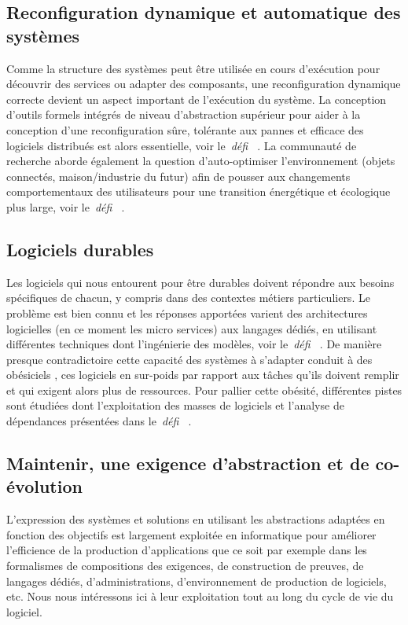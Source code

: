 \documentclass[11pt]{article}
\newcommand{\defi}[1]{\emph{défi~%
\cite{#1}}}
\begin{document}
\subsection{Reconfiguration dynamique et automatique des systèmes \label{ss:maintenance:reconfiguration}}
Comme la structure des systèmes peut être utilisée en cours d'exécution pour découvrir des services ou adapter des composants, une reconfiguration dynamique correcte devient un aspect important de l'exécution du système. La conception d'outils formels intégrés de niveau d'abstraction supérieur pour aider à la conception d'une reconfiguration sûre, tolérante aux pannes et efficace des logiciels distribués est alors essentielle, voir le~\defi{reconfiguration}. 
La communauté de recherche aborde  également la question d’auto-optimiser 
l'environnement (objets connectés, maison/industrie du futur)
afin de  pousser aux changements comportementaux des utilisateurs 
pour une transition énergétique et écologique plus large, voir le~\defi{vert}.


\subsection{Logiciels durables\label{ss:maintenance:vert}}
Les logiciels qui nous entourent pour être durables doivent répondre aux besoins spécifiques de chacun, y compris dans des contextes métiers particuliers. Le problème est bien connu et les réponses apportées varient des architectures logicielles (en ce moment les micro services) aux langages dédiés, en utilisant différentes techniques dont l'ingénierie des modèles, voir le~\defi{coevolution}. 
De manière presque contradictoire 
cette capacité des systèmes à s’adapter conduit à des
\og obésiciels \fg,
ces logiciels en sur-poids par rapport aux tâches qu'ils doivent remplir et qui exigent alors plus de ressources.  
Pour pallier cette obésité, 
différentes pistes sont étudiées dont l'exploitation des masses de logiciels et
l'analyse de dépendances présentées dans le~\defi{vert}.

\subsection{Maintenir, une exigence d'abstraction et de co-évolution\label{ss:maintenance:abstractions}}
L'expression des systèmes et solutions en utilisant les abstractions adaptées en fonction des objectifs est largement exploitée en informatique \cite{DBLP:journals/sigcse/Gurer02} pour améliorer l'efficience de la production d'applications que ce soit par exemple dans les formalismes de compositions des exigences, de construction de preuves, de langages dédiés, d'administrations, d'environnement de production de logiciels, etc. Nous nous intéressons ici à leur exploitation tout au long du cycle de vie du logiciel.
\end{document}
